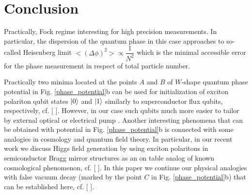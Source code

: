 \documentclass[aps, pre, preprint, groupedaddress, superscriptaddress, showkeys, showpacs] {revtex4-1}
\DeclarePairedDelimiter\ket{\lvert}{\rangle}
\begin{document}
\section{Conclusion \label{sec:conclusion}}

Practically, Fock regime interesting for high precision measurements.
In particular, the dispersion of the quantum phase in this case approaches to so-called Heisenberg limit ${<(\Delta\phi)^2> \propto \dfrac{1}{N^2}}$ which is the minimal accessible error for the phase measurement in respect of total particle number.

Practically two minima located at the points $A$ and $B$ of $W$-shape quantum phase potential in Fig. \ref{phase_potential}b can be used for initialization of exciton polariton qubit states $\ket{0}$ and $\ket{1}$ similarly to superconductor flux qubits, respectively, {\red cf. [ ]}.
However, in our case such qubits much more easier to tailor by external optical or electrical pump {\red [ ]}.
Another interesting phenomena that can be obtained with potential in Fig. \ref{phase_potential}b is connected with some analogies in cosmology and quantum field theory.
In particular, in our recent work {\red [ ]} we discuss Higgs field generation by using exciton polaritons in semiconductor Bragg mirror structures as an on table analog of known cosmological phenomenon, {\red cf. [ ]}.
In this paper we continue our physical analogies with false vacuum decay (marked by the point $C$ in Fig. \ref{phase_potential}b) that can be established here, {\red cf. [ ]}.

\pagebreak


\end{document}
